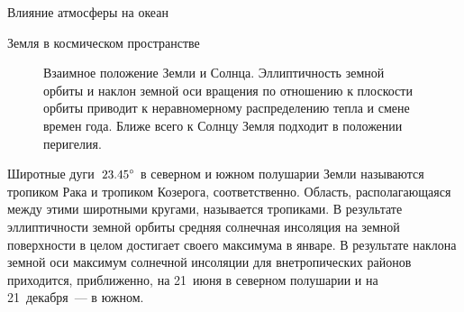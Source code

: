 \begin{chapter}{Влияние атмосферы на океан}
\begin{section}{Земля в космическом пространстве}
\begin{figure}[t!]
\caption{Взаимное положение Земли и Солнца. Эллиптичность земной
орбиты и наклон земной оси вращения по отношению к плоскости орбиты приводит 
к неравномерному распределению тепла и смене времен года. Ближе всего к Солнцу
Земля подходит в положении перигелия.}
\label{fig:earthinspace}
\vspace{-4ex}
\end{figure}
%

Широтные дуги~${23.45}^\circ$ в северном и южном полушарии Земли
называются тропиком Рака и тропиком Козерога, соответственно. Область,
располагающаяся между этими широтными кругами, называется тропиками. В
результате эллиптичности земной орбиты средняя солнечная
инсоляция на земной поверхности в целом достигает своего максимума в январе. В
результате наклона земной оси максимум солнечной инсоляции для
внетропических районов приходится, приближенно, на 21~июня в северном полушарии 
и на 21~декабря~--- в южном.
%


\end{section}
\end{chapter}
